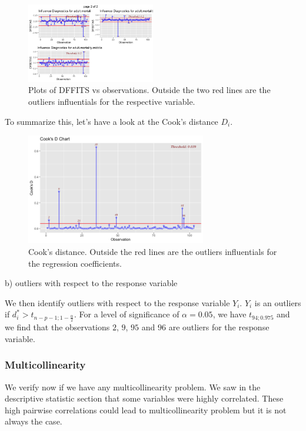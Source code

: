 \begin{figure}[H]
	\centering
	\includegraphics[width=0.5\textwidth]{figures/models/dfbetas_2.png}
	\caption{Plots of DFFITS vs observations. Outside the two red lines are the outliers influentials for the respective variable.}
	\label{fig:dfbetas2}
\end{figure}

To summarize this, let's have a look at the Cook's distance $D_i$.

\begin{figure}[H]
	\centering
	\includegraphics[width=0.7\textwidth]{figures/models/cooks.png}
	\caption{Cook's distance. Outside the red lines are the outliers influentials for the regression coefficients.}
	\label{fig:cooks_distance}
\end{figure}

b) outliers with respect to the response variable

We then identify outliers with respect to the response variable $Y_i$. $Y_i$ is an outliers if $d_i^{\ast} > t_{n-p-1;1 - \frac{\alpha}{2}}$. For a level of significance of $\alpha = 0.05$, we have $t_{94 ; 0.975}$ and we find that the observations $2$, $9$, $95$ and $96$ are outliers for the response variable.

\subsubsection{Multicollinearity}

We verify now if we have any multicollinearity problem. We saw in the descriptive statistic section that some variables were highly correlated. These high pairwise correlations could lead to multicollinearity problem but it is not always the case.

